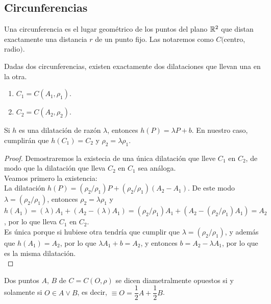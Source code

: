 \subsection{Circunferencias}

\begin{ndef}[Circunferencia]
  Una circunferencia es el lugar geométrico de los puntos del plano $\mathbb{R}^2$ que distan exactamente una distancia $r$ de un punto fijo. Las notaremos como $C($centro, radio$)$.
\end{ndef}

\begin{nprop}
  Dadas dos circunferencias, existen exactamente dos dilataciones que llevan una en la otra.
  \begin{enumerate}
  \item $C_1 = C(A_1,\rho_1)$.
  \item $C_2 = C(A_2,\rho_2)$.
  \end{enumerate}
  Si $h$ es una dilatación de razón $\lambda$, entonces $h(P) = \lambda P + b$.
  En nuestro caso, cumplirán que $h(C_1) = C_2$ y $\rho_2 = \lambda \rho_1$.
\end{nprop}

\begin{proof}
	Demostraremos la existecia de una única dilatación que lleve $C_1$ en $C_2$, de modo que la dilatación que lleva $C_2$ en $C_1$ sea análoga. \\

	Veamos primero la existencia:\\
		La dilatación $h(P) = (\rho_2/\rho_1)P + (\rho_2/\rho_1) (A_2-A_1)$. De este modo $\lambda = (\rho_2/\rho_1)$, entonces $\rho_2 = \lambda \rho_1$ y $h(A_1) = (\lambda)A_1 +  (A_2-(\lambda)A_1) = (\rho_2/\rho_1)A_1 +  (A_2-(\rho_2/\rho_1)A_1) = A_2$, por lo que lleva $C_1$ en $C_2$. \\

	Es única porque si hubiese otra tendría que cumplir que  $\lambda = (\rho_2/\rho_1)$, y además que $h(A_1) = A_2$, por lo que $\lambda A_1 + b = A_2$, y entonces $b= A_2- \lambda A_1$, por lo que es la misma dilatación.\\

\end{proof}

\begin{ndef}
  Dos puntos $A$, $B$ de $C = C(O,\rho) $ se dicen diametralmente opuestos si y solamente si $O \in A \vee B$, es decir, $\equiv O = \dfrac{1}{2}A + \dfrac{1}{2}B$.
\end{ndef}


